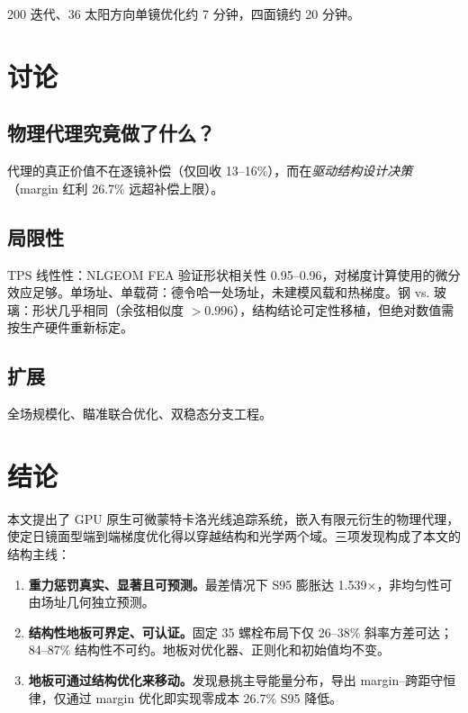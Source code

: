 \documentclass[12pt,a4paper]{ctexart}
\begin{document}
200 迭代、36 太阳方向单镜优化约 7 分钟，四面镜约 20 分钟。

\section{讨论}

\subsection{物理代理究竟做了什么？}

代理的真正价值不在逐镜补偿（仅回收 13--16\%），而在\emph{驱动结构设计决策}（margin 红利 26.7\% 远超补偿上限）。

\subsection{局限性}

TPS 线性性：NLGEOM FEA 验证形状相关性 0.95--0.96，对梯度计算使用的微分效应足够。单场址、单载荷：德令哈一处场址，未建模风载和热梯度。钢 vs. 玻璃：形状几乎相同（余弦相似度 $>0.996$），结构结论可定性移植，但绝对数值需按生产硬件重新标定。

\subsection{扩展}

全场规模化、瞄准联合优化、双稳态分支工程。

\section{结论}

本文提出了 GPU 原生可微蒙特卡洛光线追踪系统，嵌入有限元衍生的物理代理，使定日镜面型端到端梯度优化得以穿越结构和光学两个域。三项发现构成了本文的结构主线：

\begin{enumerate}
  \item \textbf{重力惩罚真实、显著且可预测。}最差情况下 S95 膨胀达 1.539$\times$，非均匀性可由场址几何独立预测。
  \item \textbf{结构性地板可界定、可认证。}固定 35 螺栓布局下仅 26--38\% 斜率方差可达；84--87\% 结构性不可约。地板对优化器、正则化和初始值均不变。
  \item \textbf{地板可通过结构优化来移动。}发现悬挑主导能量分布，导出 margin--跨距守恒律，仅通过 margin 优化即实现零成本 26.7\% S95 降低。
\end{enumerate}
\end{document}
